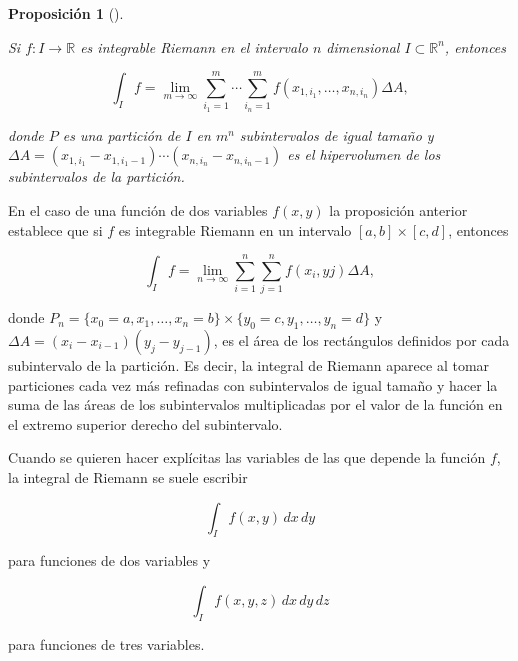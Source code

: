 \documentclass[
  a4paper,
]{scrreport}
\theoremstyle{plain}
\theoremstyle{definition}
\theoremstyle{plain}
\newtheorem{proposition}{Proposición}[chapter]
\theoremstyle{plain}
\theoremstyle{definition}
\theoremstyle{definition}
\theoremstyle{remark}
\begin{document}
\begin{proposition}[]\protect\hypertarget{prp-integral-riemann-n-dimensional}{}\label{prp-integral-riemann-n-dimensional}

Si \(f:I\to \mathbb{R}\) es integrable Riemann en el intervalo \(n\)
dimensional \(I\subset \mathbb{R}^n\), entonces

\[
\int_I f = \lim_{m\to \infty} \sum_{i_1=1}^m\cdots \sum_{i_n=1}^m f(x_{1,i_1},\ldots, x_{n,i_n})\Delta A,
\]

donde \(P\) es una partición de \(I\) en \(m^n\) subintervalos de igual
tamaño y
\(\Delta A = (x_{1,i_1}-x_{1,i_1-1})\cdots (x_{n,i_n}-x_{n,i_n-1})\) es
el hipervolumen de los subintervalos de la partición.

\end{proposition}

En el caso de una función de dos variables \(f(x,y)\) la proposición
anterior establece que si \(f\) es integrable Riemann en un intervalo
\([a,b]\times [c,d]\), entonces

\[
\int_I f = \lim_{n\to \infty}\sum_{i=1}^n\sum_{j=1}^n f(x_i, yj)\Delta A,
\]

donde
\(P_n = \{x_0=a,x_1,\ldots,x_n=b\}\times \{y_0=c,y_1,\ldots,y_n=d\}\) y
\(\Delta A = (x_i-x_{i-1})(y_j-y_{j-1})\), es el área de los rectángulos
definidos por cada subintervalo de la partición. Es decir, la integral
de Riemann aparece al tomar particiones cada vez más refinadas con
subintervalos de igual tamaño y hacer la suma de las áreas de los
subintervalos multiplicadas por el valor de la función en el extremo
superior derecho del subintervalo.

\begin{tcolorbox}[enhanced jigsaw, titlerule=0mm, arc=.35mm, colframe=quarto-callout-note-color-frame, bottomrule=.15mm, opacitybacktitle=0.6, rightrule=.15mm, coltitle=black, colback=white, toprule=.15mm, title=\textcolor{quarto-callout-note-color}{\faInfo}\hspace{0.5em}{Nota}, leftrule=.75mm, bottomtitle=1mm, opacityback=0, breakable, colbacktitle=quarto-callout-note-color!10!white, toptitle=1mm, left=2mm]

Cuando se quieren hacer explícitas las variables de las que depende la
función \(f\), la integral de Riemann se suele escribir

\[
\int_{I} f(x,y) \,dx\,dy
\]

para funciones de dos variables y

\[
\int_{I} f(x,y,z) \,dx\,dy\,dz 
\]

para funciones de tres variables.

\end{tcolorbox}
\end{document}
